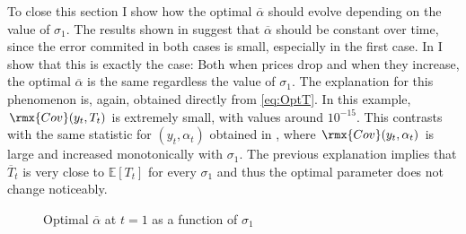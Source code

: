 \documentclass[english, a4paper, 12pt]{article}
\begin{document}
To close this section I show how the optimal $\overline{\alpha}$ should evolve depending on the value of $\sigma_{1}$. The results shown in  suggest that $\overline{\alpha}$ should be constant over time, since the error commited in both cases is small, especially in the first case. In  I show that this is exactly the case: Both when prices drop and when they increase, the optimal $\overline{\alpha}$ is the same regardless the value of $\sigma_{1}$. The explanation for this phenomenon is, again, obtained directly from \eqref{eq:OptT}. In this example, $\rmx{Cov}(y_{t}, T_{t})$ is extremely small, with values around $10^{-15}$. This contrasts with the same statistic for $(y_{t}, \alpha_{t})$ obtained in , where $\rmx{Cov}(y_{t}, \alpha_{t})$ is large and increased monotonically with $\sigma_{1}$. The previous explanation implies that $\overline{T}_{t}$ is very close to $\mathbb{E}[T_{t}]$ for every $\sigma_{1}$ and thus the optimal parameter does not change noticeably.
	\begin{figure}[H]
		\caption{Optimal $\overline{\alpha}$ at $t = 1$ as a function of $\sigma_{1}$}
		\label{fig:CategoryAlphaPlot}
		\hspace{0.02\textwidth}
		
		\vspace{-1.5ex}
	\end{figure}
\end{document}
